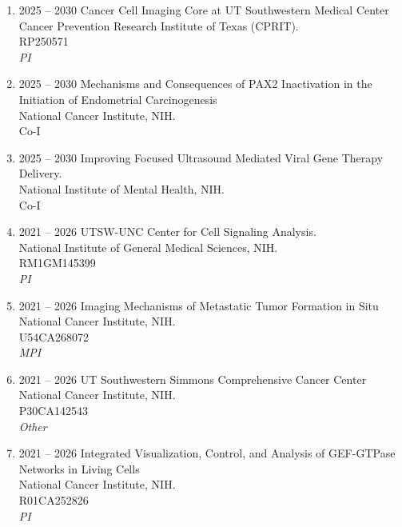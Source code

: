 \begin{enumerate}
[leftmargin=!,
labelindent=0pt,
itemindent=-66pt,
label=\textbullet]

\item 2025 -- 2030 
\hspace{8pt}
Cancer Cell Imaging Core at UT Southwestern Medical Center \\
Cancer Prevention Research Institute of Texas (CPRIT). \\
RP250571 \\ 
{\it PI}


\item 2025 -- 2030 
\hspace{8pt}
Mechanisms and Consequences of PAX2 Inactivation in the Initiation of Endometrial Carcinogenesis \\
National Cancer Institute, NIH. \\
Co-I \\ 

\item 2025 -- 2030 
\hspace{8pt}
Improving Focused Ultrasound Mediated Viral Gene Therapy Delivery. \\
National Institute of Mental Health, NIH. \\
Co-I \\ 

\item 2021 -- 2026 
\hspace{8pt}
UTSW-UNC Center for Cell Signaling Analysis. \\
National Institute of General Medical Sciences, NIH. \\
RM1GM145399 \\ 
{\it PI}

\item 2021 -- 2026 
\hspace{8pt}
Imaging Mechanisms of Metastatic Tumor Formation in Situ \\
National Cancer Institute, NIH. \\
U54CA268072 \\ 
{\it MPI}

\item 2021 -- 2026 
\hspace{8pt}
UT Southwestern Simmons Comprehensive Cancer Center \\
National Cancer Institute, NIH. \\
P30CA142543 \\ 
{\it Other}

\item 2021 -- 2026 
\hspace{8pt}
Integrated Visualization, Control, and Analysis of GEF-GTPase Networks in Living Cells \\
National Cancer Institute, NIH. \\
R01CA252826 \\ 
{\it PI}

\end{enumerate}

